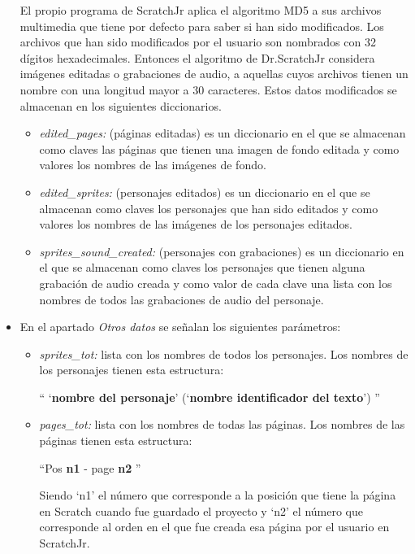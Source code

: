 \documentclass[a4paper, 12pt]{book}
\begin{document}
\begin{itemize}
    \vspace{5mm}
    El propio programa de ScratchJr aplica el algoritmo MD5 a sus archivos multimedia que tiene por defecto para saber si han sido modificados.
    Los archivos que han sido modificados por el usuario son nombrados con 32 dígitos hexadecimales.
    Entonces el algoritmo de Dr.ScratchJr considera imágenes editadas o grabaciones de audio, a aquellas cuyos archivos tienen un nombre con una longitud mayor a 30 caracteres.
    Estos datos modificados se almacenan en los siguientes diccionarios.
     \begin{itemize}
        \item \emph{edited\_pages:} (páginas editadas) es un diccionario en el que se almacenan como claves las páginas que tienen una imagen de fondo editada y como valores los nombres de las imágenes de fondo.
        \item \emph{edited\_sprites:} (personajes editados) es un diccionario en el que se almacenan como claves los personajes que han sido editados y como valores los nombres de las imágenes de los personajes editados.
        \item \emph{sprites\_sound\_created:} (personajes con grabaciones) es un diccionario en el que se almacenan como claves los personajes que tienen alguna grabación de audio creada y como valor de cada clave una lista con los nombres de todos las grabaciones de audio del personaje.
     \end{itemize}
    
    \item En el apartado \emph{Otros datos} se señalan los siguientes parámetros:
     \begin{itemize}
        \item \emph{sprites\_tot:} lista con los nombres de todos los personajes. Los nombres de los personajes tienen esta estructura:
         \begin{center}
            `` `\textbf{nombre del personaje}' (`\textbf{nombre identificador del texto}') ''
         \end{center}

        \item \emph{pages\_tot:} lista con los nombres de todas las páginas.
        Los nombres de las páginas tienen esta estructura:
         \begin{center}
            ``Pos \textbf{n1} - page \textbf{n2} ''
         \end{center}
        Siendo `n1' el número que corresponde a la posición que tiene la página en Scratch cuando fue guardado el proyecto y `n2' el número que corresponde al orden en el que fue creada esa página por el usuario en ScratchJr.


\end{itemize}
\end{itemize}
\end{document}
